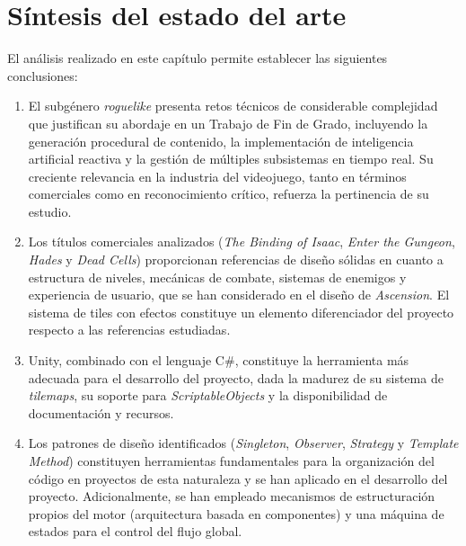 \section{Síntesis del estado del arte}


El análisis realizado en este capítulo permite establecer las siguientes conclusiones:

\begin{enumerate}
\item El subgénero \textit{roguelike} presenta retos técnicos de considerable complejidad que justifican su abordaje en un Trabajo de Fin de Grado, incluyendo la generación procedural de contenido, la implementación de inteligencia artificial reactiva y la gestión de múltiples subsistemas en tiempo real. Su creciente relevancia en la industria del videojuego, tanto en términos comerciales como en reconocimiento crítico, refuerza la pertinencia de su estudio.
\item Los títulos comerciales analizados (\textit{The Binding of Isaac}, \textit{Enter the Gungeon}, \textit{Hades} y \textit{Dead Cells}) proporcionan referencias de diseño sólidas en cuanto a estructura de niveles, mecánicas de combate, sistemas de enemigos y experiencia de usuario, que se han considerado en el diseño de \textit{Ascension}. El sistema de tiles con efectos constituye un elemento diferenciador del proyecto respecto a las referencias estudiadas.
\item Unity, combinado con el lenguaje C\#, constituye la herramienta más adecuada para el desarrollo del proyecto, dada la madurez de su sistema de \textit{tilemaps}, su soporte para \textit{ScriptableObjects} y la disponibilidad de documentación y recursos.
\item Los patrones de diseño identificados (\textit{Singleton}, \textit{Observer}, \textit{Strategy} y \textit{Template Method}) constituyen herramientas fundamentales para la organización del código en proyectos de esta naturaleza y se han aplicado en el desarrollo del proyecto. Adicionalmente, se han empleado mecanismos de estructuración propios del motor (arquitectura basada en componentes) y una máquina de estados para el control del flujo global.
\end{enumerate}












